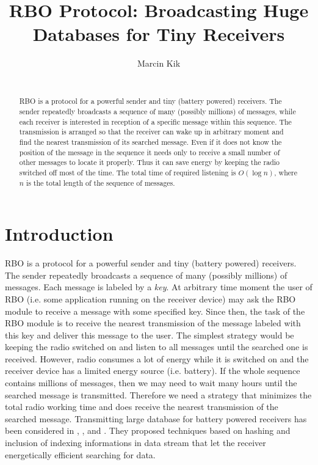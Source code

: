 \documentclass{llncs}
\title{RBO Protocol:
Broadcasting Huge Databases for Tiny Receivers%
}
\author{Marcin Kik\\
\email{ {Marcin.Kik@pwr.wroc.pl}}\\
\institute{{Institute of Mathematics and Computer Science},\\
           {Wroc\l aw University of Technology}\\
           Wybrze\.ze Wyspia\'nskiego 27, 50-370 Wroc\l aw, Poland}
}
\begin{document}
\maketitle %


\begin{abstract}
RBO is a protocol for a powerful sender and tiny (battery powered) receivers.
The sender repeatedly broadcasts a sequence of many (possibly millions) of messages,
while each receiver is interested in reception of a specific message within this
sequence.
The transmission is arranged so that the receiver can wake up in arbitrary moment and find
 the nearest transmission of its searched message.  
Even if it does not know the position of the message in the sequence it needs only
to receive a small number of other messages to locate it properly.
Thus it can save energy by keeping the radio switched off most of the time.
The total time of required listening is $O(\log n)$, where $n$ is
the total length of the sequence of messages.
   

\end{abstract}


\section{Introduction}
RBO is a protocol for a powerful sender and tiny (battery powered) receivers.
The sender repeatedly broadcasts a sequence of many (possibly millions) of messages.
Each message is labeled by a {\em key}.
At arbitrary time moment the user of RBO 
(i.e. some application running on the receiver device)
may ask the RBO module to receive a message with some specified key.
Since then, the task of the RBO module is to receive the nearest transmission 
of the  message labeled with this key and deliver this message to the user.
The simplest strategy would be keeping the radio switched on and listen to all
messages until the searched one is received.
However, radio consumes a lot of energy while it is switched on and the receiver 
device has a limited energy source (i.e. battery).
If the whole sequence contains millions of messages, then
we may need to wait many hours until the searched message is transmitted.
Therefore we need a strategy that minimizes the total radio working time
and does receive the nearest transmission of the searched message. 
Transmitting large database for battery powered
receivers has been considered in 
\cite{DBLP:conf/sigmod/ImielinskiVB94},
\cite{DBLP:conf/edbt/ImielinskiVB94},
and 
\cite{DBLP:journals/tkde/ImielinskiVB97}.
They proposed techniques based on hashing and inclusion of
indexing informations in data stream that let the receiver 
energetically efficient searching for data. 
\end{document}
